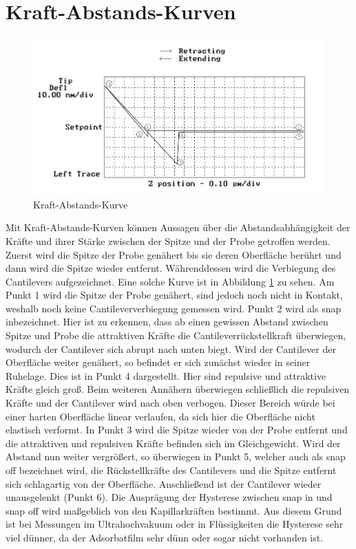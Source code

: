 \section{Kraft-Abstands-Kurven}
\begin{figure}[H]
    \centering
    \includegraphics[width=130mm,scale=0.7]{Rasterkraftmikroskop/include/Kraft-Abstands-Kurve.PNG}
    \caption{Kraft-Abstands-Kurve} 
    \label{fig:Kraft-Abstands-Kurve}
\end{figure}
Mit Kraft-Abstands-Kurven können Aussagen über die Abstandsabhängigkeit der Kräfte und ihrer Stärke zwischen der Spitze und der Probe getroffen werden. Zuerst wird die Spitze der Probe genähert bis sie deren Oberfläche berührt und dann wird die Spitze wieder entfernt. Währenddessen wird die Verbiegung des Cantilevers aufgezeichnet. Eine solche Kurve ist in Abbildung \ref{fig:Kraft-Abstands-Kurve} zu sehen. Am Punkt 1 wird die Spitze der Probe genähert, sind jedoch noch nicht in Kontakt, weshalb noch keine Cantileververbiegung gemessen wird. Punkt 2 wird als \dq snap in\dq bezeichnet. Hier ist zu erkennen, dass ab einen gewissen Abstand zwischen Spitze und Probe die attraktiven Kräfte die Cantileverrückstellkraft überwiegen, wodurch der Cantilever sich abrupt nach unten biegt. Wird der Cantilever der Oberfläche weiter genähert, so befindet er sich zunächst wieder in seiner Ruhelage. Dies ist in Punkt 4 dargestellt. Hier sind repulsive und attraktive Kräfte gleich groß. Beim weiteren Annähern überwiegen schließlich die repulsiven Kräfte und der Cantilever wird nach oben verbogen. Dieser Bereich würde bei einer harten Oberfläche linear verlaufen, da sich hier die Oberfläche nicht elastisch verformt. In Punkt 3 wird die Spitze wieder von der Probe entfernt und die attraktiven und repulsiven Kräfte befinden sich im Gleichgewicht. Wird der Abstand nun weiter vergrößert, so überwiegen in Punkt 5, welcher auch als \dq snap off \dq bezeichnet wird, die Rückstellkräfte des Cantilevers und die Spitze entfernt sich schlagartig von der Oberfläche. Anschließend ist der Cantilever wieder unausgelenkt (Punkt 6). Die Ausprägung der Hysterese zwischen snap in und snap off wird maßgeblich von den Kapillarkräften bestimmt. Aus diesem Grund ist bei Messungen im Ultrahochvakuum oder in Flüssigkeiten die Hysterese sehr viel dünner, da der Adsorbatfilm sehr dünn oder sogar nicht vorhanden ist. \\

